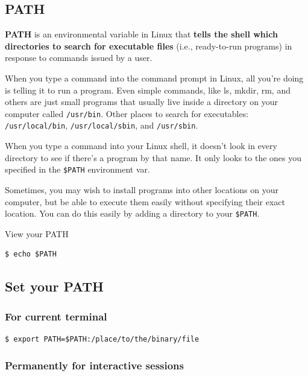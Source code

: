 \documentclass{article}
\newenvironment{codetemplate}[1][]{%
  \mybasecolorbox[#1]
  \itshape
}{%
  \endmybasecolorbox
}
\begin{document}
\subsection{PATH}
\textbf{PATH} is an environmental variable in Linux that \textbf{tells the shell which directories to search for executable files} (i.e., ready-to-run programs) in response to commands issued by a user.

When you type a command into the command prompt in Linux, all you're doing is telling it to run a program. Even simple commands, like ls, mkdir, rm, and others are just small programs that usually live inside a directory on your computer called \verb|/usr/bin|. Other places to search for executables: \verb+/usr/local/bin+, \verb+/usr/local/sbin+, and \verb+/usr/sbin+. 

When you type a command into your Linux shell, it doesn't look in every directory to see if there's a program by that name. It only looks to the ones you specified in the \verb|$PATH| environment var.

Sometimes, you may wish to install programs into other locations on your computer, but be able to execute them easily without specifying their exact location. You can do this easily by adding a directory to your \verb|$PATH|.

View your PATH
\begin{codetemplate}{}
\begin{verbatim}
$ echo $PATH
\end{verbatim}
\end{codetemplate}

\subsection{Set your PATH}
\subsubsection{For current terminal}
\begin{codetemplate}{}
\begin{verbatim}
$ export PATH=$PATH:/place/to/the/binary/file
\end{verbatim}
\end{codetemplate}

\subsubsection{Permanently for interactive sessions}
\end{document}
